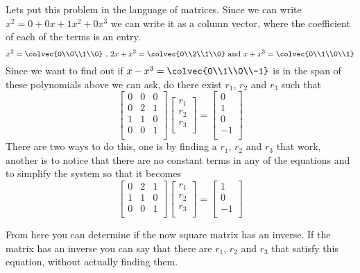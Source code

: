 {Lets put this problem in the language of matrices. Since we can write $x^2 = 0 + 0x+1x^2 +0x^3$ we can write it as a column vector, where the coefficient of each of the terms is an entry.
\[
x^2 =\colvec{0\\0\\1\\0} \text{ , } 2x+x^2 =\colvec{0\\2\\1\\0} \text{ and }
x+x^3 =\colvec{0\\1\\0\\1}
 \]
Since we want to find out if $x-x^3 =\colvec{0\\1\\0\\-1}$ is in the span of these polynomials above we can ask, do there exist $r_1$, $r_2$ and $r_3$ such that 
\[
\begin{bmatrix}
0& 0& 0\\
0& 2& 1\\
1& 1& 0\\
0& 0& 1\\
\end{bmatrix}
\begin{bmatrix}
r_1\\
r_2\\
r_3\\
\end{bmatrix}
= 
\begin{bmatrix}
0\\
1\\
0\\
-1\\
\end{bmatrix}
\]
There are two ways to do this, one is by finding a $r_1$, $r_2$ and $r_3$ that work, another is to notice that there are no constant terms in any of the equations and to simplify the system so that it becomes
\[
\begin{bmatrix}
0& 2& 1\\
1& 1& 0\\
0& 0& 1\\
\end{bmatrix}
\begin{bmatrix}
r_1\\
r_2\\
r_3\\
\end{bmatrix}
= 
\begin{bmatrix}
1\\
0\\
-1\\
\end{bmatrix}
\]

From here you can determine if the now square matrix has an inverse. If the matrix has an inverse you can say that there are $r_1$, $r_2$ and $r_3$ that satisfy this equation, without actually finding them.
} %

\newpage
